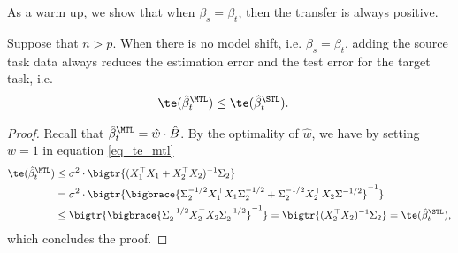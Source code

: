 
As a warm up, we show that when $\beta_s = \beta_t$, then the transfer is always positive.

\begin{proposition}\label{prop_monotone}
	Suppose that $n > p$.
  When there is no model shift, i.e. $\beta_s = \beta_t$, adding the source task data always reduces the estimation error and the test error for the target task, i.e.
	\begin{align}
		\te(\hat{\beta}_{t}^{\MTL}) &\le \te(\hat{\beta}_t^{\STL}). \label{eq_mono_te}
	\end{align}
\end{proposition}

\begin{proof}
	Recall that $\hat{\beta}_t^{\MTL} = \hat{w} \cdot \hat{B}$.
	By the optimality of $\hat{w}$, we have by setting $w = 1$ in equation \eqref{eq_te_mtl}
	\begin{align*}
		\te(\hat{\beta}_t^{\MTL}) &\le \sigma^2 \cdot \bigtr{(X_1^{\top}X_1 + X_2^{\top}X_2)^{-1}\Sigma_2} \\
		&= \sigma^2 \cdot \bigtr{\bigbrace{\Sigma_2^{-1/2}X_1^{\top}X_1\Sigma_2^{-1/2} + \Sigma_2^{-1/2}X_2^{\top}X_2\Sigma^{-1/2}}^{-1}} \\
		&\le \bigtr{\bigbrace{\Sigma_2^{-1/2}X_2^{\top}X_2\Sigma_2^{-1/2}}^{-1}}
			= \bigtr{(X_2^{\top}X_2)^{-1} \Sigma_2} = \te(\hat{\beta}_t^{\STL}),
	\end{align*}
	which concludes the proof.
\end{proof}

